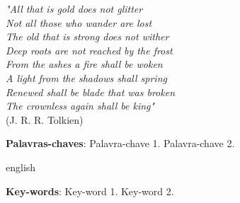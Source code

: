 \documentclass[
	12pt,		%
    openright, 	%
    oneside,	%
    a4paper,	%
	french,				%
	spanish,			%
	english,				%
    brazil,				%
]{abntex2}
\begin{document}
\begin{agradecimentos}



\end{agradecimentos}

\begin{epigrafe}
    \vspace*{\fill}
	\begin{flushright}
\textit{    
"All that is gold does not glitter \\
Not all those who wander are lost \\
The old that is strong does not wither \\
Deep roots are not reached by the frost \\
From the ashes a fire shall be woken \\
A light from the shadows shall spring \\
Renewed shall be blade that was broken \\
The crownless again shall be king" \\
}
    (J. R. R. Tolkien)
	\end{flushright}
\end{epigrafe}


\begin{resumo}
 \blindtext

 \vspace{\onelineskip}
    
 \noindent
 \textbf{Palavras-chaves}: Palavra-chave 1. Palavra-chave 2.
\end{resumo}

\begin{resumo}[Abstract]
 \begin{otherlanguage*}{english}
   \blindtext

   \vspace{\onelineskip}
 
   \noindent 
   \textbf{Key-words}: Key-word 1. Key-word 2. 
 \end{otherlanguage*}
\end{resumo}


\listoffigures*
\cleardoublepage

\listoftables*
\cleardoublepage
\end{document}
